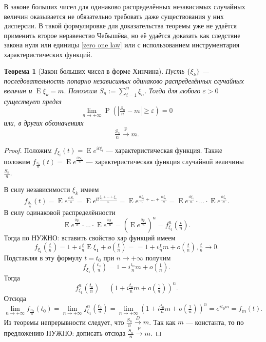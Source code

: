 \documentclass[12pt]{article}
\newtheorem{theorem}{Теорема}
\numberwithin{theorem}{section}
\theoremstyle{definition}
\newcommand{\prob}{\operatorname{P}}
\newcommand{\expect}{\operatorname{E}}
\newcommand{\TODO}[1]{\textcolor{todocolor}{НУЖНО: #1}}
\begin{document}
	В законе больших чисел для одинаково распределённых независимых случайных величин 
	оказывается не обязательно требовать даже существования у них дисперсии.
	В такой формулировке для доказательства теоремы уже не удаётся применить второе неравенство Чебышёва,
	но её удаётся доказать как следствие закона нуля или единицы \ref{zero one law}	
	или с использованием инструментария характеристических функций.
	
	\begin{theorem}[Закон больших чисел в форме Хинчина]
		Пусть $ \{\xi_k\} $ --- последовательность попарно независимых
		одинаково распределённых случайных величин и $ \expect\xi_k = m $. 
		Положим $ S_n := \sum\limits_{i = 1}^{n} \xi_n $.
		Тогда для любого $ \varepsilon > 0 $ существует предел
		$$ \lim\limits_{n \to +\infty} \prob(|\tfrac{S_n}{n} - m| \geqslant \varepsilon) = 0 $$ 
		или, в других обозначениях 
		$$ \tfrac{S_n}{n} \overset{\prob}{\to} m. $$
	\end{theorem}
	
	\begin{proof}
		Положим $ f_{\xi_i}(t) = \expect e^{it\xi_i} $ --- характеристическая функция.
		Также положим $ f_{\tfrac{S_n}{n}}(t) = \expect e^{\tfrac{itS_n}{n}} $ --- характеристическая функция
		случайной величины $ \tfrac{S_n}{n} $.
		
		В силу независимости $ \xi_k $ имеем
		$$ f_{\tfrac{S_n}{n}}(t) = \expect e^{\tfrac{itS_n}{n}} = \expect e^{it\tfrac{\xi_1 + \ldots + \xi_n}{n}}
		= \expect e^{\tfrac{it\xi_1}{n} + \ldots + \tfrac{it\xi_n}{n}}
		= \expect e^{\tfrac{it\xi_1}{n}} \cdot \ldots \cdot \expect e^{\tfrac{it\xi_n}{n}}. $$
		В силу одинаковой распределённости
		$$ \expect e^{\tfrac{it\xi_1}{n}} \cdot \ldots \cdot \expect e^{\tfrac{it\xi_n}{n}}
		= (\expect e^{\tfrac{it\xi_1}{n}})^n = f_{\xi_1}^n(\tfrac{t}{n}). $$
		Тогда по \TODO{вставить свойство хар функций}
		имеем
		$$ f_{\xi_1}(\tfrac{t}{n}) 
		= 1 + i\tfrac{t}{n}\expect\xi_1 + o(\tfrac{t}{n})
		= = 1 + i\tfrac{t}{n}m + o(\tfrac{t}{n}), \tfrac{t}{n} \to 0. $$
		Подставляя в эту формулу $ t = t_0 $ при $ n \to +\infty $ получим 
		$$ f_{\xi_1}(\tfrac{t_0}{n}) = 1 + i\tfrac{t_0}{n}m + o(\tfrac{1}{n}). $$
		Тогда
		$$ f_{\xi_1}^n(\tfrac{t_0}{n}) = \left(1 + i\tfrac{t_0}{n}m + o(\tfrac{1}{n})\right)^n. $$
		Отсюда
		$$ \lim\limits_{n \to +\infty} f_{\tfrac{S_n}{n}}(t_0)
		= \lim\limits_{n \to +\infty} f_{\xi_1}^n(\tfrac{t_0}{n})
		= \lim\limits_{n \to +\infty} \left(1 + i\tfrac{t_0}{n}m + o(\tfrac{1}{n})\right)^n
		= e^{it_0m} = f_{m}(t). $$
		Из теоремы непрерывности следует, что $ \tfrac{S_n}{n} \overset{D}{\to} m $.
		Так как $ m $ --- константа, то по предложению \TODO{дописать} отсюда $ \tfrac{S_n}{n} \overset{\prob}{\to} m $.
	\end{proof}
	
\end{document}
